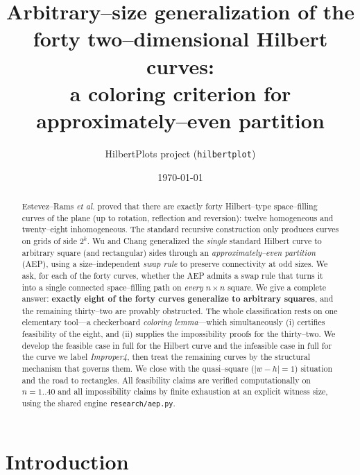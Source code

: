 \documentclass[11pt]{article}
\title{\bf Arbitrary--size generalization of the forty two--dimensional Hilbert
curves:\\ a coloring criterion for approximately--even partition}
\author{HilbertPlots project (\texttt{hilbertplot})}
\date{\today}
\theoremstyle{definition}
\begin{document}
\maketitle

\begin{abstract}
Estevez--Rams \emph{et al.} proved that there are exactly forty Hilbert--type
space--filling curves of the plane (up to rotation, reflection and reversion): twelve
homogeneous and twenty--eight inhomogeneous. The standard recursive construction only
produces curves on grids of side $2^k$. Wu and Chang generalized the \emph{single}
standard Hilbert curve to arbitrary square (and rectangular) sides through an
\emph{approximately--even partition} (AEP), using a size--independent \emph{swap rule}
to preserve connectivity at odd sizes. We ask, for each of the forty curves, whether the
AEP admits a swap rule that turns it into a single connected space--filling path on
\emph{every} $n\times n$ square. We give a complete answer: \textbf{exactly eight of the
forty curves generalize to arbitrary squares}, and the remaining thirty--two are provably
obstructed. The whole classification rests on one elementary tool---a checkerboard
\emph{coloring lemma}---which simultaneously (i) certifies feasibility of the eight, and
(ii) supplies the impossibility proofs for the thirty--two. We develop the feasible case
in full for the Hilbert curve and the infeasible case in full for the curve we label
\emph{Improper4}, then treat the remaining curves by the structural mechanism that governs
them. We close with the quasi--square ($|w-h|=1$) situation and the road to rectangles.
All feasibility claims are verified computationally on $n=1..40$ and all impossibility
claims by finite exhaustion at an explicit witness size, using the shared engine
\texttt{research/aep.py}.
\end{abstract}

\section{Introduction}
\end{document}
